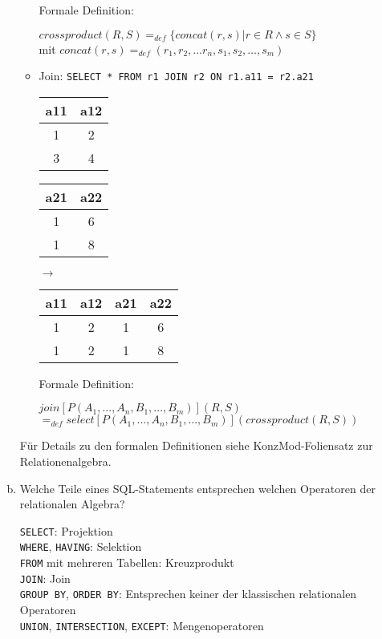 \begin{enumerate}[a)]
\begin{solution}
\begin{itemize}
		Formale Definition:

		\(crossproduct(R, S) = _{def} \{concat (r, s) | r \in R \wedge s \in S\}\) \\
		mit
		\(concat(r, s) =_{def} (r_1, r_2, \ldots r_n, s_1, s_2, \ldots, s_m) \)

		\item Join: \texttt{SELECT * FROM r1 JOIN r2 ON r1.a11 = r2.a21}

		\begin{tabular}{ | c | c | }
			\hline
			a11 	& 		a12		\\
			\hline
			1 		& 		2 		\\
			\hline
			3 		& 		4 		\\
			\hline
		\end{tabular}
		\begin{tabular}{ | c | c | }
			\hline
			a21 	&		a22	\\
			\hline
			1 		& 		6 		\\
			\hline
			1 		& 		8 		\\
			\hline
		\end{tabular}
		$\rightarrow$
		\begin{tabular}{ | c | c | c | c | }
			\hline
			a11 	&		a12 	& 		a21 	&		a22	\\
			\hline
			1 		& 		2 		& 		1 		& 		6 		\\
			\hline
			1 		& 		2 		& 		1		& 		8 		\\
			\hline
		\end{tabular}

		Formale Definition:

		\(join[P (A_1, ... , A_n, B_1, ... , B_m)](R, S) \)\\ \(= _{def} select [P (A_1, ... , A_n, B_1, ... , B_m)] (crossproduct (R, S))\)
	\end{itemize}

	Für Details zu den formalen Definitionen siehe KonzMod-Foliensatz zur Relationenalgebra.
	\end{solution}


	\item Welche Teile eines SQL-Statements entsprechen welchen Operatoren der relationalen Algebra?

	\begin{solution}
	\texttt{SELECT}: Projektion \\
	\texttt{WHERE}, \texttt{HAVING}: Selektion \\
	\texttt{FROM} mit mehreren Tabellen: Kreuzprodukt \\
	\texttt{JOIN}: Join \\
	\texttt{GROUP BY}, \texttt{ORDER BY}: Entsprechen keiner der klassischen relationalen Operatoren \\
	\texttt{UNION}, \texttt{INTERSECTION}, \texttt{EXCEPT}: Mengenoperatoren


\end{solution}
\end{enumerate}
